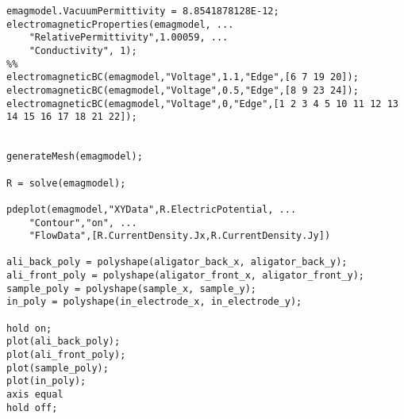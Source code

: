 \begin{lstlisting}
emagmodel.VacuumPermittivity = 8.8541878128E-12;
electromagneticProperties(emagmodel, ...
    "RelativePermittivity",1.00059, ...
    "Conductivity", 1);
%%
electromagneticBC(emagmodel,"Voltage",1.1,"Edge",[6 7 19 20]);
electromagneticBC(emagmodel,"Voltage",0.5,"Edge",[8 9 23 24]);
electromagneticBC(emagmodel,"Voltage",0,"Edge",[1 2 3 4 5 10 11 12 13 14 15 16 17 18 21 22]);


generateMesh(emagmodel);

R = solve(emagmodel);

pdeplot(emagmodel,"XYData",R.ElectricPotential, ...
    "Contour","on", ...
    "FlowData",[R.CurrentDensity.Jx,R.CurrentDensity.Jy])

ali_back_poly = polyshape(aligator_back_x, aligator_back_y);
ali_front_poly = polyshape(aligator_front_x, aligator_front_y);
sample_poly = polyshape(sample_x, sample_y);
in_poly = polyshape(in_electrode_x, in_electrode_y);

hold on;
plot(ali_back_poly);
plot(ali_front_poly);
plot(sample_poly);
plot(in_poly);
axis equal
hold off;
\end{lstlisting}
